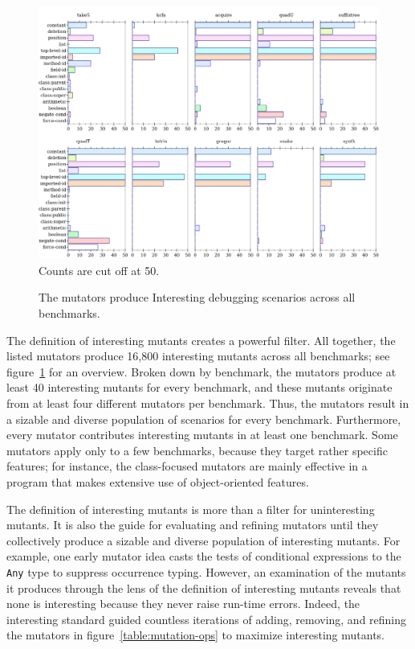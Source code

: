 \begin{figure} \footnotesize
 \centering
 \includegraphics[scale=0.33]{./plots/mutant-breakdown}
  Counts are cut off at 50.

\caption{The mutators produce Interesting debugging scenarios across all benchmarks.} 
 \label{fig:mutant-breakdown}
\end{figure}

The definition of interesting mutants creates a powerful filter. All
together, the listed mutators produce 16,800 interesting mutants across all benchmarks; see
figure~\ref{fig:mutant-breakdown} for an overview. Broken down by benchmark, the
mutators produce at least 40 interesting mutants for every benchmark, and
these mutants originate from at least four different mutators per benchmark.
Thus, the mutators result in a sizable and diverse population of scenarios for
every benchmark.  Furthermore, every mutator contributes interesting mutants in at least
one benchmark.  Some mutators apply only to a few benchmarks, because they
target rather specific features; for instance, the class-focused mutators are
mainly effective in a program that makes extensive use of object-oriented
features.

The definition of interesting mutants is more than a filter for
uninteresting mutants. It is also the guide for evaluating and refining
mutators until they collectively produce a sizable and diverse population of
interesting mutants. For example, one early mutator idea casts the
tests of conditional expressions to the {\tt Any} type to
suppress occurrence typing. However, an examination of the mutants it
produces through the lens of the definition of interesting mutants
reveals that none is interesting because they never raise run-time errors.
Indeed, the interesting standard guided countless iterations of adding,
removing, and refining the mutators in figure~\ref{table:mutation-ops}
to maximize interesting mutants.
